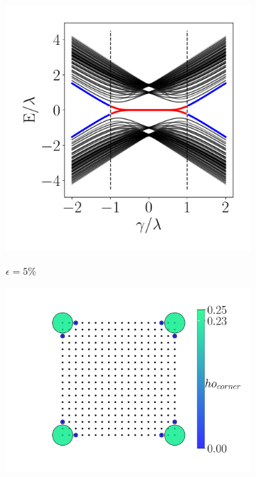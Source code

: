 \begin{figure}[h!]
     \begin{minipage}[h!]{0.7\textwidth}
         \begin{subfigure}[b!]{0.44 \textwidth}
             \caption{$\epsilon = 5\%$}
             \includegraphics[width=\textwidth]{Imagenes/Resultados_Hoti_Cuadrado/bands_square_shh_0.05.pdf}
             \label{}
         \end{subfigure}\hspace*{-0.5em}
         \begin{subfigure}[b!]{0.56 \textwidth}
             \caption*{}
             \includegraphics[width=\textwidth]{Imagenes/Resultados_Hoti_Cuadrado/proyection_square_0.05.pdf}
             \label{}
         \end{subfigure}\hspace*{-0.5em}
     \end{minipage}\vspace*{-2.5em}
     

\end{figure}
